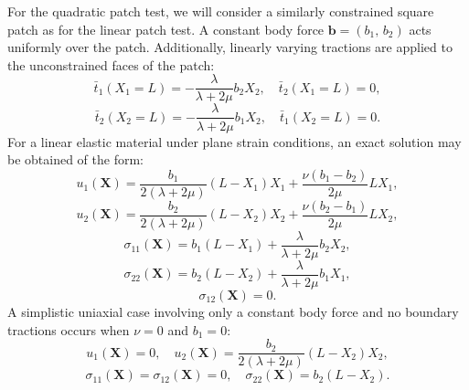 For the quadratic patch test, we will consider a similarly constrained square patch as for the linear patch test. A constant body force $\mathbf{b} = (b_1, \, b_2)$ acts uniformly over the patch. Additionally, linearly varying tractions are applied to the unconstrained faces of the patch:
\begin{equation}
	\bar{t}_1 (X_1 = L) = - \frac{\lambda}{\lambda + 2 \mu} b_2 X_2, \quad \bar{t}_2 (X_1 = L) = 0,
\end{equation}
\begin{equation}
	\bar{t}_2 (X_2 = L) = - \frac{\lambda}{\lambda + 2 \mu} b_1 X_2, \quad \bar{t}_1 (X_2 = L) = 0.
\end{equation}
For a linear elastic material under plane strain conditions, an exact solution may be obtained of the form:
\begin{equation}
	u_1 (\mathbf{X}) = \frac{b_1}{2 (\lambda + 2 \mu)} (L - X_1) X_1 + \frac{\nu (b_1 - b_2)}{2 \mu} L X_1,
\end{equation}
\begin{equation}
	u_2 (\mathbf{X}) = \frac{b_2}{2 (\lambda + 2 \mu)} (L - X_2) X_2 + \frac{\nu (b_2 - b_1)}{2 \mu} L X_2,
\end{equation}
\begin{equation}
	\sigma_{11} (\mathbf{X}) = b_1 (L - X_1) + \frac{\lambda}{\lambda + 2 \mu} b_2 X_2,
\end{equation}
\begin{equation}
	\sigma_{22} (\mathbf{X}) = b_2 (L -  X_2) + \frac{\lambda}{\lambda + 2 \mu} b_1 X_1,
\end{equation}
\begin{equation}
	\sigma_{12} (\mathbf{X}) = 0.
\end{equation}
A simplistic uniaxial case involving only a constant body force and no boundary tractions occurs when $\nu = 0$ and $b_1 = 0$:
\begin{equation}
	u_1 (\mathbf{X}) = 0, \quad u_2 (\mathbf{X}) = \frac{b_2}{2 (\lambda + 2 \mu)} (L - X_2) X_2,
\end{equation}
\begin{equation}
	\sigma_{11} (\mathbf{X}) = \sigma_{12} (\mathbf{X}) = 0, \quad \sigma_{22} (\mathbf{X}) = b_2 (L -  X_2).
\end{equation}

